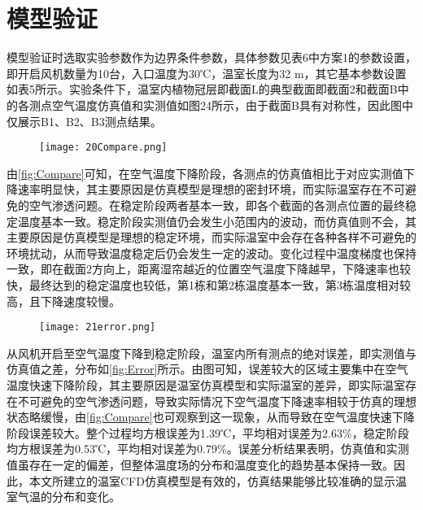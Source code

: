 \section{模型验证}
模型验证时选取实验参数作为边界条件参数，具体参数见表6中方案1的参数设置，即开启风机数量为10台，入口温度为30℃，温室长度为32 m，其它基本参数设置如表5所示。实验条件下，温室内植物冠层即截面L的典型截面即截面2和截面B中的各测点空气温度仿真值和实测值如图24所示，由于截面B具有对称性，因此图中仅展示B1、B2、B3测点结果。
		 \begin{figure}[!htp]
  			\centering
 			\texttt{[image: 20Compare.png]}
		\end{figure}
由\ref{fig:Compare}可知，在空气温度下降阶段，各测点的仿真值相比于对应实测值下降速率明显快，其主要原因是仿真模型是理想的密封环境，而实际温室存在不可避免的空气渗透问题。在稳定阶段两者基本一致，即各个截面的各测点位置的最终稳定温度基本一致。稳定阶段实测值仍会发生小范围内的波动，而仿真值则不会，其主要原因是仿真模型是理想的稳定环境，而实际温室中会存在各种各样不可避免的环境扰动，从而导致温度稳定后仍会发生一定的波动。变化过程中温度梯度也保持一致，即在截面2方向上，距离湿帘越近的位置空气温度下降越早，下降速率也较快，最终达到的稳定温度也较低，第1栋和第2栋温度基本一致，第3栋温度相对较高，且下降速度较慢。
		 \begin{figure}[!htp]
  			\centering
 			\texttt{[image: 21error.png]}
		\end{figure}
从风机开启至空气温度下降到稳定阶段，温室内所有测点的绝对误差，即实测值与仿真值之差，分布如\ref{fig:Error}所示。由图可知，误差较大的区域主要集中在空气温度快速下降阶段，其主要原因是温室仿真模型和实际温室的差异，即实际温室存在不可避免的空气渗透问题，导致实际情况下空气温度下降速率相较于仿真的理想状态略缓慢，由\ref{fig:Compare}也可观察到这一现象，从而导致在空气温度快速下降阶段误差较大。整个过程均方根误差为1.39℃，平均相对误差为2.63\%，稳定阶段均方根误差为0.53℃，平均相对误差为0.79\%。误差分析结果表明，仿真值和实测值虽存在一定的偏差，但整体温度场的分布和温度变化的趋势基本保持一致。因此，本文所建立的温室CFD仿真模型是有效的，仿真结果能够比较准确的显示温室气温的分布和变化。

